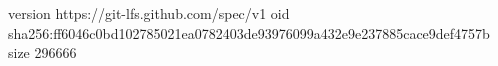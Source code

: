 version https://git-lfs.github.com/spec/v1
oid sha256:ff6046c0bd102785021ea0782403de93976099a432e9e237885cace9def4757b
size 296666
